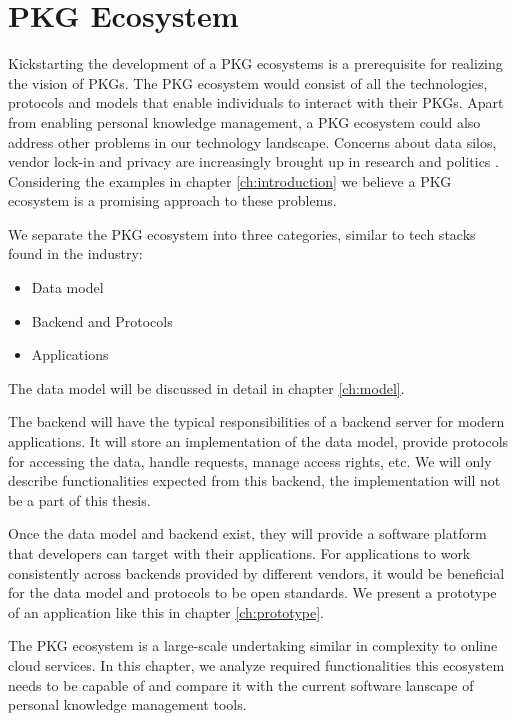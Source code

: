 \chapter{PKG Ecosystem} \label{ch:ecosystem}

Kickstarting the development of a PKG ecosystems is a prerequisite for realizing the vision of PKGs. The PKG ecosystem would consist of all the technologies, protocols and models that enable individuals to interact with their PKGs. Apart from enabling personal knowledge management, a PKG ecosystem could also address other problems in our technology landscape. Concerns about data silos, vendor lock-in and privacy are increasingly brought up in research and politics \cite{missingCitation}. Considering the examples in chapter \ref{ch:introduction} we believe a PKG ecosystem is a promising approach to these problems.

We separate the PKG ecosystem into three categories, similar to tech stacks found in the industry:

\begin{itemize}
    \item Data model
    \item Backend and Protocols
    \item Applications
\end{itemize}

The data model will be discussed in detail in chapter \ref{ch:model}.

The backend will have the typical responsibilities of a backend server for modern applications. It will store an implementation of the data model, provide protocols for accessing the data, handle requests, manage access rights, etc.
We will only describe functionalities expected from this backend, the implementation will not be a part of this thesis.

Once the data model and backend exist, they will provide a software platform that developers can target with their applications. For applications to work consistently across backends provided by different vendors, it would be beneficial for the data model and protocols to be open standards.
We present a prototype of an application like this in chapter \ref{ch:prototype}.

The PKG ecosystem is a large-scale undertaking similar in complexity to online cloud services. In this chapter, we analyze required functionalities this ecosystem needs to be capable of and compare it with the current software lanscape of personal knowledge management tools.

